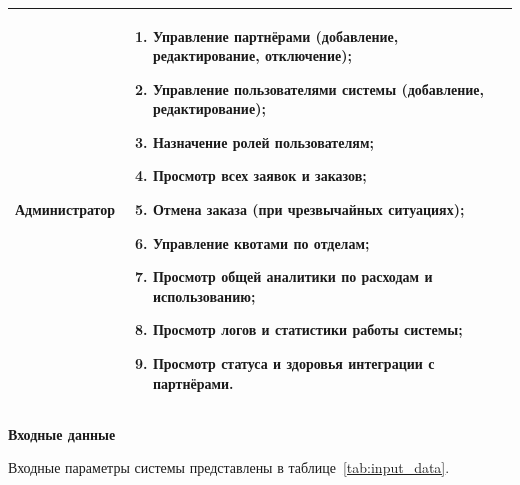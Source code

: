 \documentclass{bmstu}
\begin{document}
\begin{longtable}{|p{}|p{}|}
Администратор & 
\begin{enumerate}
    \item Управление партнёрами (добавление, редактирование, отключение);
    \item Управление пользователями системы (добавление, редактирование);
    \item Назначение ролей пользователям;
    \item Просмотр всех заявок и заказов;
    \item Отмена заказа (при чрезвычайных ситуациях);
    \item Управление квотами по отделам;
    \item Просмотр общей аналитики по расходам и использованию;
    \item Просмотр логов и статистики работы системы;
    \item Просмотр статуса и здоровья интеграции с партнёрами.
\end{enumerate} \\
\hline

\end{longtable}

\begin{center}
    \textbf{Входные данные}
\end{center}

Входные параметры системы представлены в таблице~\ref{tab:input_data}.
\end{document}
